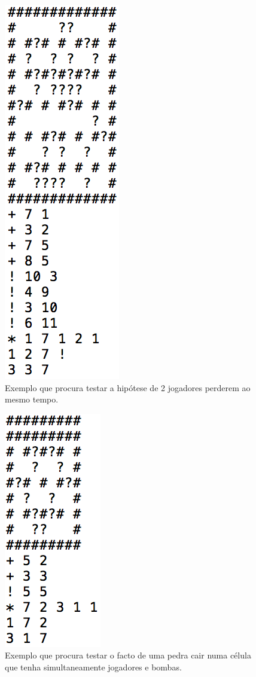 \documentclass[a4paper]{article}
\begin{document}
\begin{figure}[H]
\centering 
\includegraphics[scale=0.40]{exemplo25}
\caption{{\small Exemplo que procura testar a hipótese de 2 jogadores perderem ao mesmo tempo.}}
\end{figure}

\begin{figure}[H]
\centering 
\includegraphics[scale=0.40]{exemplo28}
\caption{{\small Exemplo que procura testar o facto de uma pedra cair numa célula que tenha 
simultaneamente jogadores e bombas.}}
\end{figure}
\end{document}
